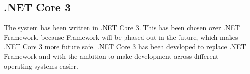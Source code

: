 \subsection{.NET Core 3} \label{ssc:tech_core}
The system has been written in .NET Core 3. This has been chosen over .NET Framework, because Framework will be phased out in the future, which makes .NET Core 3 more future safe. .NET Core 3 has been developed to replace .NET Framework and with the ambition to make development across different operating systems easier.